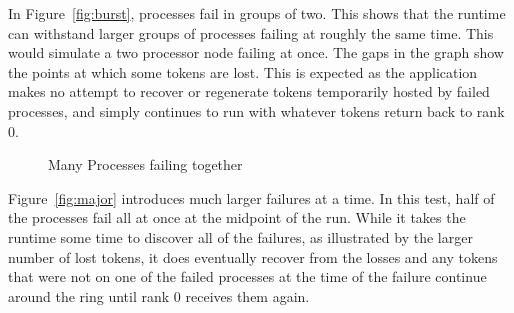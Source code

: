 \documentclass{llncs}
\begin{document}
In Figure~\ref{fig:burst}, processes fail in groups of two. This shows
that the runtime can withstand larger groups of processes failing at
roughly the same time. This would simulate a two processor node
failing at once. The gaps in the graph show the points at which some
tokens are lost. This is expected as the application makes no attempt
to recover or regenerate tokens temporarily hosted by failed
processes, and simply continues to run with whatever tokens return
back to rank 0.

\begin{figure}[t]
  \centering
  \caption{Many Processes failing together}\label{fig:many}
\end{figure}
Figure~\ref{fig:major} introduces much larger failures at a time. In
this test, half of the processes fail all at once at the midpoint of
the run. While it takes the runtime some time to discover all of the
failures, as illustrated by the larger number of lost tokens, it does
eventually recover from the losses and any tokens that were not on one
of the failed processes at the time of the failure continue around the
ring until rank 0 receives them again.
\end{document}

